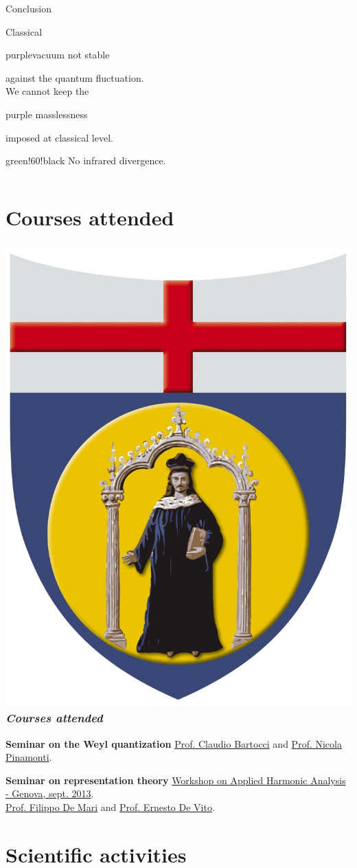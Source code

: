 \documentclass[a4paper,11pt]{beamer} %
\newcommand{\LogoUnivGenova}{\protect\includegraphics[scale=0.015]{fig_genova.JPG}} %
\begin{document}
\begin{frame}
\begin{columns}
\begin{column}{.60\textwidth}
\begin{block}{Conclusion}
\begin{scriptsize}
Classical \begin{color}{purple}vacuum not stable \end{color}against the quantum fluctuation.\\
We cannot keep the \begin{color}{purple} masslessness\end{color} imposed at classical level.\\
\begin{color}{green!60!black} No infrared divergence.\end{color}
\end{scriptsize}
\end{block}
\end{column}
\end{columns}
\end{frame}

\section{Courses attended}

\begin{frame}
\frametitle{\LogoUnivGenova {} \emph{\small{Courses attended}}}
\begin{block}{\bf Seminar on the Weyl quantization} 
\href{http://www.dima.unige.it/~bartocci/}{Prof. Claudio Bartocci} and \href{http://www.pinamonti.eu/}{Prof. Nicola Pinamonti}.\\
\cite{Binz2004} 
\end{block}
\vspace{8mm}
\begin{block}{\bf Seminar on representation theory} 
\href{http://anarm.dima.unige.it/genova2013/}{Workshop on Applied Harmonic Analysis - Genova, sept. 2013}. \\
\href{http://www.dima.unige.it/~demari/}{Prof. Filippo De Mari} and \href{http://www.dima.unige.it/~devito/}{Prof. Ernesto De Vito}. \\
\cite{Varada1984} 
\end{block}
\end{frame}

\section{Scientific activities}
\end{document}
